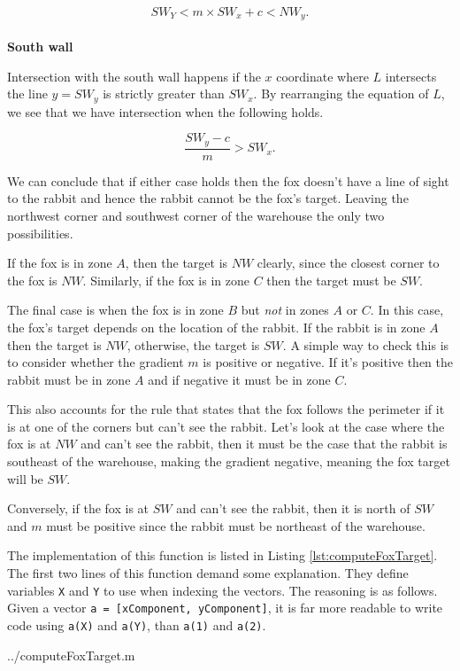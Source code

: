$$ SW_Y < m \times SW_x + c < NW_y.$$\\

\noindent \textbf{South wall}

Intersection with the south wall happens if the $x$ coordinate where $L$ intersects the line $y = SW_y$ is strictly greater than $SW_x$. By rearranging the equation of $L$, we see that we have intersection when the following holds.

$$ \frac{SW_y - c}{m} > SW_x. $$

We can conclude that if either case holds then the fox doesn't have a line of sight to the rabbit and hence the rabbit cannot be the fox's target. Leaving the northwest corner and southwest corner of the warehouse the only two possibilities.

If the fox is in zone $A$, then the target is $NW$ clearly, since the closest corner to the fox is $NW$. Similarly, if the fox is in zone $C$ then the target must be $SW$. 

The final case is when the fox is in zone $B$ but \emph{not} in zones $A$ or $C$. In this case, the fox's target depends on the location of the rabbit. If the rabbit is in zone $A$ then the target is $NW$, otherwise, the target is $SW$. A simple way to check this is to consider whether the gradient $m$ is positive or negative. If it's positive then the rabbit must be in zone $A$ and if negative it must be in zone $C$.

This also accounts for the rule that states that the fox follows the perimeter if it is at one of the corners but can't see the rabbit. Let's look at the case where the fox is at $NW$ and can't see the rabbit, then it must be the case that the rabbit is southeast of the warehouse, making the gradient negative, meaning the fox target will be $SW$.

Conversely, if the fox is at $SW$ and can't see the rabbit, then it is north of $SW$ and $m$ must be positive since the rabbit must be northeast of the warehouse.

The implementation of this function is listed in Listing \ref{lst:computeFoxTarget}. The first two lines of this function demand some explanation. They define variables \texttt{X} and \texttt{Y} to use when indexing the vectors. The reasoning is as follows. Given a vector \texttt{a = [xComponent, yComponent]}, it is far more readable to write code using \texttt{a(X)} and \texttt{a(Y)}, than \texttt{a(1)} and \texttt{a(2)}.

  {../computeFoxTarget.m}